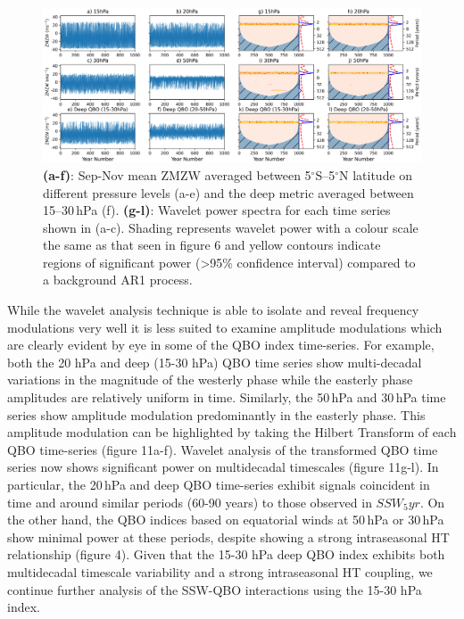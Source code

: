 \begin{center}
\begin{figure}[h!]
\noindent\includegraphics[width = \linewidth]{Figures/Figures-origins/QBO_levels.png}
\caption[QBO timeseries and associated wavelet power spectra at different levels in UKESM]{\textbf{(a-f)}: Sep-Nov mean ZMZW averaged between 5$^\circ$S--5$^\circ$N latitude on different pressure levels (a-e) and the deep metric averaged between 15--30\,hPa (f). \textbf{(g-l)}: Wavelet power spectra for each time series shown in (a-c). Shading represents wavelet power with a colour scale the same as that seen in figure 6 and yellow contours indicate regions of significant power (>95\% confidence interval) compared to a background AR1 process.}
\label{QBO_levs}
\end{figure}
\end{center}


While the wavelet analysis technique is able to isolate and reveal frequency modulations very well it is less suited to examine amplitude modulations which are clearly evident by eye in some of the QBO index time-series. For example, both the 20 hPa and deep (15-30 hPa) QBO time series show multi-decadal variations in the magnitude of the westerly phase while the easterly phase amplitudes are relatively uniform in time. Similarly, the 50\,hPa and 30\,hPa time series show amplitude modulation predominantly in the easterly phase. This amplitude modulation can be highlighted by taking the Hilbert Transform of each QBO time-series (figure 11a-f). Wavelet analysis of the transformed QBO time series now shows significant power on multidecadal timescales (figure 11g-l). In particular, the 20\,hPa and deep QBO time-series exhibit signals coincident in time and around similar periods (60-90 years) to those observed in $SSW_5yr$. On the other hand, the QBO indices based on equatorial winds at 50\,hPa or 30\,hPa show minimal power at these periods, despite showing a strong intraseasonal HT relationship (figure 4). Given that the 15-30 hPa deep QBO  index exhibits  both multidecadal timescale variability and a strong intraseasonal HT coupling, we continue further analysis of the SSW-QBO interactions using the 15-30 hPa index. 

